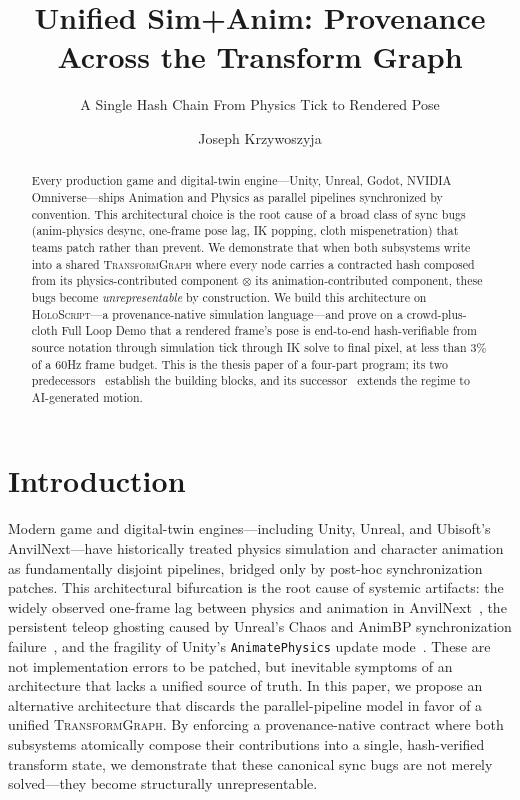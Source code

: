 \documentclass[sigconf,nonacm]{acmart}
\title{Unified Sim+Anim: Provenance Across the Transform Graph}
\subtitle{A Single Hash Chain From Physics Tick to Rendered Pose}
\author{Joseph Krzywoszyja}
\affiliation{%
  \institution{Infinitus Systems}
  \country{USA}
}
\newcommand{\holoscript}{\textsc{HoloScript}}
\newcommand{\transformgraph}{\textsc{TransformGraph}}
\newcommand{\tropmult}{\otimes}
\begin{document}
\begin{abstract}
Every production game and digital-twin engine---Unity, Unreal, Godot,
NVIDIA Omniverse---ships Animation and Physics as parallel pipelines
synchronized by convention. This architectural choice is the root
cause of a broad class of sync bugs (anim-physics desync, one-frame
pose lag, IK popping, cloth mispenetration) that teams patch rather
than prevent. We demonstrate that when both subsystems write into a
shared \transformgraph{} where every node carries a contracted hash
composed from its physics-contributed component $\tropmult$ its
animation-contributed component, these bugs become \emph{unrepresentable}
by construction. We build this architecture on
\holoscript{}---a provenance-native simulation language---and prove on
a crowd-plus-cloth Full Loop Demo that a rendered frame's pose is
end-to-end hash-verifiable from source notation through simulation
tick through IK solve to final pixel, at less than 3\% of a 60Hz
frame budget. This is the thesis paper of a four-part program; its
two predecessors~\cite{paper-6-anim-sca2027,paper-7-ik-siggraph2027}
establish the building blocks, and its successor~\cite{paper-9-motion-asia2027}
extends the regime to AI-generated motion.
\end{abstract}


\maketitle

\section{Introduction}
\label{sec:intro}

Modern game and digital-twin engines---including Unity, Unreal, and Ubisoft's AnvilNext---have historically treated physics simulation and character animation as fundamentally disjoint pipelines, bridged only by post-hoc synchronization patches. This architectural bifurcation is the root cause of systemic artifacts: the widely observed one-frame lag between physics and animation in AnvilNext~\cite{anvilnext-anim-arch}, the persistent teleop ghosting caused by Unreal's Chaos and AnimBP synchronization failure~\cite{ue5-chaos-async,ue5-forum-physanim}, and the fragility of Unity's \texttt{AnimatePhysics} update mode~\cite{unity-animatephysics-doc,unity-forum-animphys}. These are not implementation errors to be patched, but inevitable symptoms of an architecture that lacks a unified source of truth. In this paper, we propose an alternative architecture that discards the parallel-pipeline model in favor of a unified \transformgraph{}. By enforcing a provenance-native contract where both subsystems atomically compose their contributions into a single, hash-verified transform state, we demonstrate that these canonical sync bugs are not merely solved---they become structurally unrepresentable.
\end{document}
